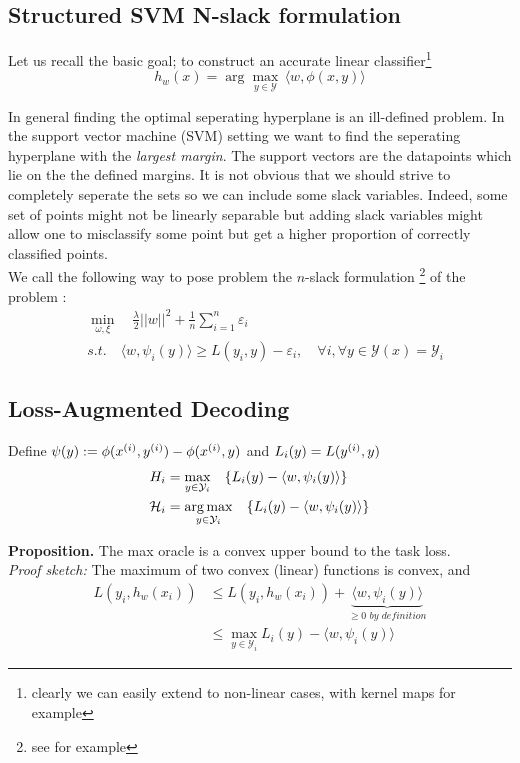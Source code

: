 \subsection{Structured SVM N-slack formulation}
Let us recall the basic goal; to construct an accurate linear
classifier\footnote{clearly we can easily extend to non-linear cases, with kernel maps for example}
\begin{equation}
  h_{w}(x)= \arg\max_{y\in \mathcal Y} \, \langle w, \phi(x,y)\rangle
\end{equation}

In general finding the optimal seperating hyperplane is an ill-defined problem.
In the support vector machine (SVM) setting we want to find the seperating
hyperplane with the \emph{largest margin}. The support vectors are the
datapoints which lie on the the defined margins. It is not obvious
that we should strive to completely seperate the sets so we can include some
slack variables. Indeed, some set of points might not be linearly separable but
adding slack variables might allow one to misclassify some point but get 
a higher proportion of correctly classified points.\\

We call the following way to pose problem the $n$-slack formulation
\footnote{see \citet{moguerzaSupportVectorMachines2006} for example} of the problem :
\begin{align}
    &\min_{\omega, \xi}\quad\frac{\lambda}{2}||w||^{2}+ \frac{1}{n}\sum_{i=1}^{n}\varepsilon_{i}\\
    &\textit{s.t.}\quad \langle w, \psi_{i}(y)\rangle \geq L(y_{i},y)-
\varepsilon_{i},\quad\forall i ,\forall y \in\mathcal{Y}(x)=\mathcal{Y}_{i}
\end{align}

\subsection{Loss-Augmented Decoding}
Define $\psi(y) := \phi(x^{(i)},y^{(i)}) - \phi(x^{(i)},y)$ and $L_i(y) = L(y^{(i)}, y)$
\begin{align}
H_i &= \max_{y\in\mathcal{Y}_{i}} \quad \{L_{i}(y)- \langle w, \psi_{i}(y)\rangle\} \\
\mathcal H_i &= \operatorname*{\arg\max}_{y\in\mathcal{Y}_{i}} \quad \{ L_{i}(y)- \langle w, \psi_{i}(y)\rangle \}
\end{align}

\textbf{Proposition.} The max oracle is a convex upper bound to the task loss.\\
\textit{Proof sketch:} The maximum of two convex (linear) functions is convex, and
\begin{align} L(y_{i},h_{w}(x_{i})) &\leq L(y_{i},h_{w}(x_{i})) +
        \underbrace{\langle w, \psi_{i}(y)\rangle}_{\geq 0 \textit{ by definition}} \\
    \quad\quad &\leq \max_{y\in\mathcal{Y}_{i}} L_{i}(y)- \langle w, \psi_{i}(y)\rangle
\end{align}

